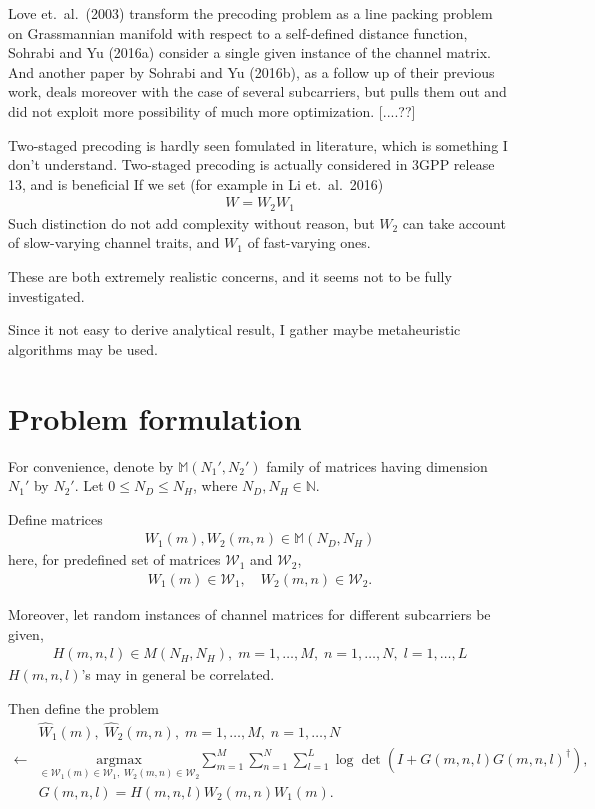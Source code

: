 \documentclass[12pt]{article}
\begin{document}
Love et.\ al.\ (2003) transform the precoding problem as a line packing problem on Grassmannian manifold with respect to a self-defined distance function, 
Sohrabi and Yu (2016a) consider a single given instance of the channel matrix.
And another paper by Sohrabi and Yu (2016b), as a follow up of their previous work, deals moreover with the case of several subcarriers, but pulls them out and did not exploit more possibility of much more optimization.
[....??]

Two-staged precoding is hardly seen fomulated in literature, which is something I don't understand.
Two-staged precoding is actually considered in 3GPP release 13, and is beneficial 
If we set (for example in Li et.\ al.\ 2016)
\begin{gather*}
W =W_2 W_1
\end{gather*}
Such distinction do not add complexity without reason, but \(W_2\) can take account of slow-varying channel traits, and \(W_1\) of fast-varying ones.

These are both extremely realistic concerns, and it seems not to be fully investigated.

Since it not easy to derive analytical result, I gather maybe metaheuristic algorithms may be used.

\section{Problem formulation}

For convenience, denote by \(\mathbb{M}(N_1',N_2')\) family of matrices having dimension \(N_1'\) by \(N_2'\).
Let \(0 \leq N_D \leq N_H\), where \(N_D,N_H \in \mathbb{N}\).

Define matrices
\begin{gather*}
W_1(m), W_2(m,n) \in \mathbb{M}(N_D,N_H)
\end{gather*}
here, for predefined set of matrices \(\mathcal{W}_1\) and \(\mathcal{W}_2\),
\begin{gather*}
W_1(m) \in \mathcal{W}_1,\quad
W_2(m,n) \in \mathcal{W}_2.
\end{gather*}

Moreover, let random instances of channel matrices for different subcarriers be given,
\begin{gather*}
H(m,n,l) \in M(N_H,N_H),\; m=1,\dotsc,M,\; n=1,\dotsc,N,\; l=1,\dotsc,L
\end{gather*}
\(H(m,n,l)\)'s may in general be correlated.

Then define the problem
\begin{align*}
& \hat{W}_1(m),\; \hat{W}_2(m,n),\; m=1,\dotsc,M,\; n=1,\dotsc,N \\
\leftarrow &\underset{\in \mathcal{W}_1(m) \in \mathcal{W}_1,\; W_2(m,n) \in \mathcal{W}_2}{\mathrm{argmax}}
\sum_{m=1}^M \sum_{n=1}^N \sum_{l=1}^L \log \det (I +G(m,n,l) G(m,n,l)^\dagger),\\
& G(m,n,l) =H(m,n,l) W_2(m,n) W_1(m).
\end{align*}
\end{document}
